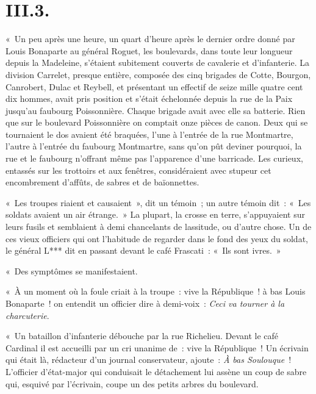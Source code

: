 \documentclass[french,twoside]{book} %
\begin{document}
\section[{III.3.}]{III.3.}

\noindent « Un peu après une heure, un quart d’heure après le dernier ordre donné par Louis Bonaparte au général Roguet, les boulevards, dans toute leur longueur depuis la Madeleine, s’étaient subitement couverts de cavalerie et d’infanterie. La division Carrelet, presque entière, composée des cinq brigades de Cotte, Bourgon, Canrobert, Dulac et Reybell, et présentant un effectif de seize mille quatre cent dix hommes, avait pris position et s’était échelonnée depuis la rue de la Paix jusqu’au faubourg Poissonnière. Chaque brigade avait avec elle sa batterie. Rien que sur le boulevard Poissonnière on comptait onze pièces de canon. Deux qui se tournaient le dos avaient été braquées, l’une à l’entrée de la rue Montmartre, l’autre à l’entrée du faubourg Montmartre, sans qu’on pût deviner pourquoi, la rue et le faubourg n’offrant même pas l’apparence d’une barricade. Les curieux, entassés sur les trottoirs et aux fenêtres, considéraient avec stupeur cet encombrement d’affûts, de sabres et de baïonnettes.\par
« Les troupes riaient et causaient », dit un témoin ; un autre témoin dit : « Les soldats avaient un air étrange. » La plupart, la crosse en terre, s’appuyaient sur leurs fusils et semblaient à demi chancelants de lassitude, ou d’autre chose. Un de ces vieux officiers qui ont l’habitude de regarder dans le fond des yeux du soldat, le général L*** dit en passant devant le café Frascati : « Ils sont ivres. »\par
« Des symptômes se manifestaient.\par
« À un moment où la foule criait à la troupe : vive la République ! à bas Louis Bonaparte ! on entendit un officier dire à demi-voix : \emph{Ceci va tourner à la charcuterie}.\par
« Un bataillon d’infanterie débouche par la rue Richelieu. Devant le café Cardinal il est accueilli par un cri unanime de : vive la République ! Un écrivain qui était là, rédacteur d’un journal conservateur, ajoute : \emph{À bas Soulouque} ! L’officier d’état-major qui conduisait le détachement lui assène un coup de sabre qui, esquivé par l’écrivain, coupe un des petits arbres du boulevard.\par
\end{document}
